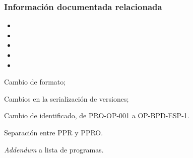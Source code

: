 \subsubsection{Información documentada relacionada}
\begin{itemize}
	\item \REvCA
	\item \REvDQ
	\item \RRCA
	\item \RTAC
	\item \BitBPH
\end{itemize}

\begin{changelog}[title=Registro de cambios,simple, sectioncmd=\subsection*,label=changelog-\thesection-\MayorVer.\MenorVer]
	\begin{version}[v=2.1, date=2023--01, author=Pablo E. Alanis]
			\item Cambio de formato;
			\item Cambios en la serialización de versiones;
			\item Cambio de identificado, de PRO-OP-001 a OP-BPD-ESP-1.
			\item Separación entre \gls{PPR} y \gls{PPRO}.
	\end{version}

	\begin{version}[v=1.9, date=2022--05, author=Alonso M.]
		\item \textit{Addendum} a lista de programas.
	\end{version}
\end{changelog}